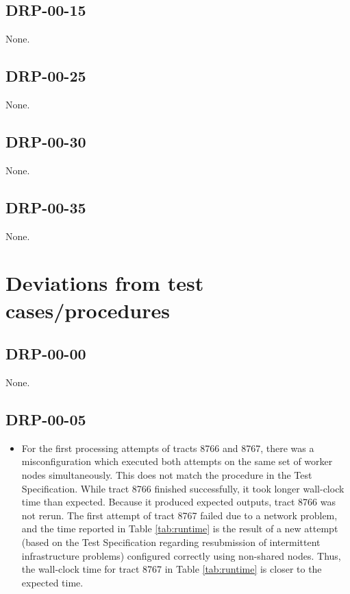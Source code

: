 \documentclass[DM,STR,toc]{lsstdoc}
\begin{document}
\subsection{DRP-00-15}
\label{sect:problems-drp-00-15}

None.

\subsection{DRP-00-25}
\label{sect:problems-drp-00-25}

None.

\subsection{DRP-00-30}
\label{sect:problems-drp-00-30}

None.

\subsection{DRP-00-35}
\label{sect:problems-drp-00-35}

None.

\section{Deviations from test cases/procedures}

\subsection{DRP-00-00}

None.

\subsection{DRP-00-05}
\label{sect:deviation-drp-00-05}

\begin{itemize}
  \item{
    For the first processing attempts of tracts 8766 and 8767, there was a misconfiguration which executed both attempts on the same set of worker nodes simultaneously.
    This does not match the procedure in the Test Specification.
    While tract 8766 finished successfully, it took longer wall-clock time than expected.
    Because it produced expected outputs, tract 8766 was not rerun.
    The first attempt of tract 8767 failed due to a network problem, and the time reported in Table \ref{tab:runtime} is the result of a new attempt (based on the Test Specification regarding resubmission of intermittent infrastructure problems) configured correctly using non-shared nodes.
    Thus, the wall-clock time for tract 8767 in Table \ref{tab:runtime} is closer to the expected
	time.
  }
\end{itemize}
\end{document}
